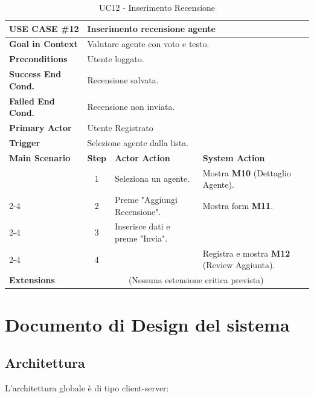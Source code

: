 \documentclass[a4paper,11pt]{report}
\begin{document}
\begin{table}[ht]
\centering
\small
\setlength{\tabcolsep}{3pt}
\renewcommand{\arraystretch}{1.3}
\noindent
\begin{tabularx}{\linewidth}{|p{3cm}|c|X|X|}
\hline
\textbf{USE CASE \#12} & \multicolumn{3}{l|}{\textbf{Inserimento recensione agente}} \\ \hline
\textbf{Goal in Context} & \multicolumn{3}{l|}{Valutare agente con voto e testo.} \\ \hline
\textbf{Preconditions} & \multicolumn{3}{l|}{Utente loggato.} \\ \hline
\textbf{Success End Cond.} & \multicolumn{3}{l|}{Recensione salvata.} \\ \hline
\textbf{Failed End Cond.} & \multicolumn{3}{l|}{Recensione non inviata.} \\ \hline
\textbf{Primary Actor} & \multicolumn{3}{l|}{Utente Registrato} \\ \hline
\textbf{Trigger} & \multicolumn{3}{l|}{Selezione agente dalla lista.} \\ \hline
\textbf{Main Scenario} & \textbf{Step} & \textbf{Actor Action} & \textbf{System Action} \\ \hline 
 & 1 & Seleziona un agente. & Mostra \textbf{M10} (Dettaglio Agente). \\ \cline{2-4} 
 & 2 & Preme "Aggiungi Recensione". & Mostra form \textbf{M11}. \\ \cline{2-4} 
 & 3 & Inserisce dati e preme "Invia". &  \\ \cline{2-4} 
 & 4 & & Registra e mostra \textbf{M12} (Review Aggiunta). \\ \hline
\textbf{Extensions} & \multicolumn{3}{c|}{(Nessuna estensione critica prevista)} \\ \hline
\end{tabularx}
\caption{UC12 - Inserimento Recensione}
\end{table}

\pagebreak

\clearpage
\chapter{Documento di Design del sistema}

\section{Architettura}

L’architettura globale è di tipo client-server:
\end{document}
